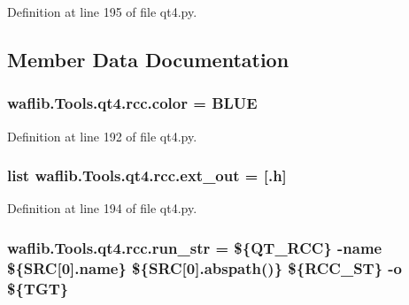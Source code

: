 Definition at line 195 of file qt4.\+py.



\subsection{Member Data Documentation}
\subsubsection[{\texorpdfstring{color}{color}}]{ waflib.\+Tools.\+qt4.\+rcc.\+color = \textquotesingle{}B\+L\+UE\textquotesingle{}\hspace{0.3cm}{\ttfamily [static]}}\hypertarget{classwaflib_1_1_tools_1_1qt4_1_1rcc_ac4cac7ef9d1a957dad9114523c15a1f3}{}\label{classwaflib_1_1_tools_1_1qt4_1_1rcc_ac4cac7ef9d1a957dad9114523c15a1f3}


Definition at line 192 of file qt4.\+py.

\subsubsection[{\texorpdfstring{ext\+\_\+out}{ext_out}}]{\setlength{\rightskip}{0pt plus 5cm}list waflib.\+Tools.\+qt4.\+rcc.\+ext\+\_\+out = \mbox{[}\textquotesingle{}.h\textquotesingle{}\mbox{]}\hspace{0.3cm}{\ttfamily [static]}}\hypertarget{classwaflib_1_1_tools_1_1qt4_1_1rcc_a5ca5ea98426c000892b63d886df2971d}{}\label{classwaflib_1_1_tools_1_1qt4_1_1rcc_a5ca5ea98426c000892b63d886df2971d}


Definition at line 194 of file qt4.\+py.

\subsubsection[{\texorpdfstring{run\+\_\+str}{run_str}}]{ waflib.\+Tools.\+qt4.\+rcc.\+run\+\_\+str = \textquotesingle{}\$\{Q\+T\+\_\+\+R\+CC\} -\/{\bf name} \$\{S\+RC\mbox{[}0\mbox{]}.{\bf name}\} \$\{S\+RC\mbox{[}0\mbox{]}.abspath()\} \$\{R\+C\+C\+\_\+\+ST\} -\/o \$\{T\+GT\}\textquotesingle{}\hspace{0.3cm}{\ttfamily [static]}}\hypertarget{classwaflib_1_1_tools_1_1qt4_1_1rcc_ae61d8513177aee015292c3571d220c67}{}\label{classwaflib_1_1_tools_1_1qt4_1_1rcc_ae61d8513177aee015292c3571d220c67}


